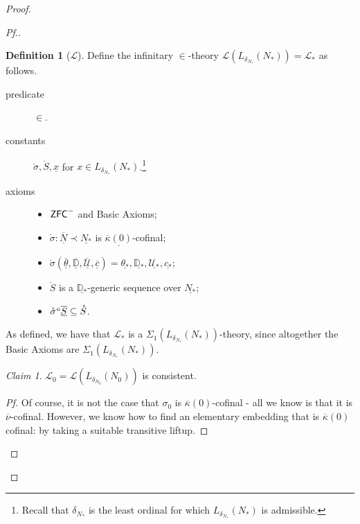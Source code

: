 \documentclass{amsart}
\theoremstyle{definition}
\newtheorem{definition}[theorem]{Definition}
\theoremstyle{remark}
\newtheorem{claimno}{Claim}
\newcommand{\D}{\mathbb{D}}
\newcommand{\N}{{\overline{N}}}
\newcommand{\U}{\mathcal{U}}
\newcommand{\ZFC}{\textup{\ensuremath{\textsf{ZFC}}}}
\begin{document}
\begin{proof}
\begin{proof}[Pf.]
\begin{definition}[$\mathcal L$]
Define the infinitary $\in$-theory $\mathcal L(L_{\delta_{N_*}}(N_*))=\mathcal L_*$ as follows. 
\begin{description}
	\item[predicate] $\in$.
	\item[constants] $\mathring{\sigma}, \mathring S, \underline x$ for $x \in L_{\delta_{N_*}}(N_*)$.\footnote{Recall that $\delta_{N_*}$ is the least ordinal for which $L_{\delta_{N_*}}(N_*)$ is admissible.}
	\item[axioms] \begin{itemize} \item $\ZFC^-$ and \textsf{Basic Axioms};
		\item $\mathring \sigma : \underline \N \prec \underline{N_*}$ is $\underline{\overline \kappa(0)}$-cofinal;
		\item $\mathring{\sigma}(\overline{\underline{\theta}}, \overline{\underline{\D}}, \overline{\underline{\U}}, \overline{\underline c})=\underline{\theta_*}, \underline{\D_*}, \underline{\U_*}, \underline{c_*}$;
		\item $\mathring S$ is a $\underline{\D_*}$-generic sequence over $\underline{N_*}$;
		\item $\mathring \sigma ``\overline{\underline S} \subseteq \mathring S$.
	\end{itemize}
\end{description} 
\end{definition}

As defined, we have that $\mathcal L_*$ is a $\Sigma_1(L_{\delta_{N_*}}(N_*))$-theory, since altogether the \textsf{Basic Axioms} are $\Sigma_1(L_{\delta_{N_*}}(N_*))$.

\begin{claimno} \label{claim:ConL0} $\mathcal L_0=\mathcal L(L_{\delta_{N_0}}(N_0))$ is consistent. \end{claimno}
\begin{proof}[Pf] Of course, it is not the case that $\sigma_0$ is $\overline \kappa(0)$-cofinal - all we know is that it is $\overline \nu$-cofinal. However, we know how to find an elementary embedding that is $\overline \kappa(0)$ cofinal: by taking a suitable transitive liftup.


\end{proof}
\end{proof}
\end{proof}
\end{document}
